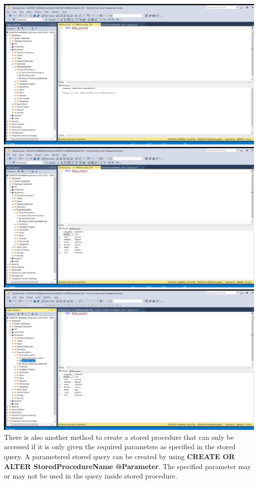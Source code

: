 \documentclass{article}
\begin{document}
\begin{center}
    \includegraphics[width=1\textwidth]{8.png} \\
    \includegraphics[width=1\textwidth]{9.png} \\
    \includegraphics[width=1\textwidth]{10.png} \\
    \newpage 
    There is also another method to create a stored procedure that can only be accessed if it is only given the required parameters as specified in the stored query. A parametered stored query can be created by using \textbf{CREATE OR ALTER StoredProcedureName @Parameter}. The specified parameter may or may not be used in the query inside stored procedure. \\

\end{center}
\end{document}
